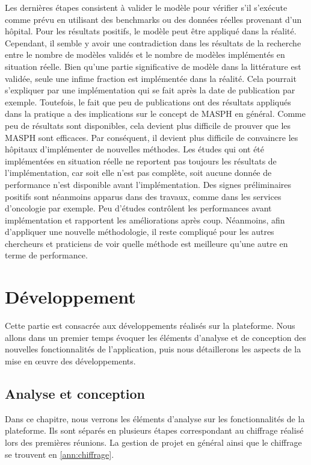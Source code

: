 \documentclass[noposter]{polytech/polytech}
\begin{document}
Les dernières étapes consistent à valider le modèle pour vérifier s'il s'exécute comme prévu en utilisant des benchmarks ou des données réelles provenant d'un hôpital. Pour les résultats positifs, le modèle peut être appliqué dans la réalité. Cependant, il semble y avoir une contradiction dans les résultats de la recherche entre le nombre de modèles validés et le nombre de modèles implémentés en situation réelle. Bien qu'une partie significative de modèle dans la littérature est validée, seule une infime fraction est implémentée dans la réalité. Cela pourrait s'expliquer par une implémentation qui se fait après la date de publication par exemple. Toutefois, le fait que peu de publications ont des résultats appliqués dans la pratique a des implications sur le concept de MASPH en général. Comme peu de résultats sont disponibles, cela devient plus difficile de prouver que les MASPH sont efficaces. Par conséquent, il devient plus difficile de convaincre les hôpitaux d'implémenter de nouvelles méthodes. Les études qui ont été implémentées en situation réelle ne reportent pas toujours les résultats de l'implémentation, car soit elle n'est pas complète, soit aucune donnée de performance n'est disponible avant l'implémentation. Des signes préliminaires positifs sont néanmoins apparus dans des travaux, comme dans les services d'oncologie par exemple. Peu d'études contrôlent les performances avant implémentation et rapportent les améliorations après coup. Néanmoins, afin d'appliquer une nouvelle méthodologie, il reste compliqué pour les autres chercheurs et praticiens de voir quelle méthode est meilleure qu'une autre en terme de performance. 


\part{Développement}

Cette partie est consacrée aux développements réalisés sur la plateforme. Nous allons dans un premier temps évoquer les éléments d'analyse et de conception des nouvelles fonctionnalités de l'application, puis nous détaillerons les aspects de la mise en œuvre des développements. 


\chapter{Analyse et conception}


Dans ce chapitre, nous verrons les éléments d'analyse sur les fonctionnalités de la plateforme. Ils sont séparés en plusieurs étapes correspondant au chiffrage réalisé lors des premières réunions. La gestion de projet en général ainsi que le chiffrage se trouvent en \autoref{ann:chiffrage}.
\end{document}
